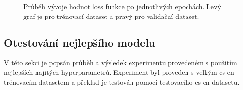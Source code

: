 \begin{figure}[H]
    \begin{center}
    \end{center}
	\caption{Průběh vývoje hodnot loss funkce po jednotlivých epochách. Levý graf je pro trénovací dataset a pravý pro validační dataset.}
\end{figure}

\subsection{Otestování nejlepšího modelu} \label{experimentBestModel}
V této sekci je popsán průběh a výsledek experimentu provedeném s použitím nejlepších najitých hyperparametrů. Experiment byl proveden s velkým cs-en trénovacím datasetem a překlad je testován pomocí testovacího cs-en datasetu.


